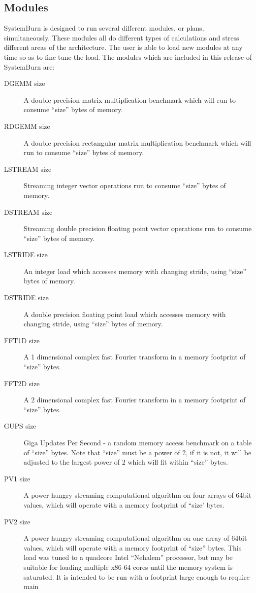 \subsection{Modules}

SystemBurn is designed to run several different modules, or plans, simultaneously. These modules all do different types of calculations and stress different areas of the architecture. The user is able
to load new modules at any time so as to fine tune the load. The modules which are included in this release of SystemBurn are: 
\begin{description}
	\item[DGEMM size] A double precision matrix multiplication benchmark which will run to consume ``size'' bytes of memory.
	\item[RDGEMM size] A double precision rectangular matrix multiplication benchmark which will run to consume ``size'' bytes of memory.
	\item[LSTREAM size] Streaming integer vector operations run to consume ``size'' bytes of memory.
	\item[DSTREAM size] Streaming double precision floating point vector operations run to consume ``size'' bytes of memory.
	\item[LSTRIDE size] An integer load which accesses memory with changing stride, using ``size'' bytes of memory.
	\item[DSTRIDE size] A double precision floating point load which accesses memory with changing stride, using ``size'' bytes of memory.
	\item[FFT1D size] A 1 dimensional complex fast Fourier transform in a memory footprint of ``size'' bytes.
	\item[FFT2D size] A 2 dimensional complex fast Fourier transform in a memory footprint of ``size'' bytes.
	\item[GUPS size] Giga Updates Per Second - a random memory access benchmark on a table of ``size'' bytes. Note that ``size'' must be a power of 2, if it is not, it will be adjusted to the largest
	power of 2 which will fit within ``size'' bytes.
	\item[PV1 size]  A power hungry streaming computational algorithm on four arrays of 64bit values, which will operate with a memory footprint of ``size' bytes.
	\item[PV2 size]  A power hungry streaming computational algorithm on one array of 64bit values, which will operate with a memory footprint of ``size'' bytes. This load was tuned to a quadcore Intel
			``Nehalem'' processor, but may be suitable for loading multiple x86-64 cores until the memory system is saturated. It is intended to be run with a footprint large enough to require main

\end{description}
